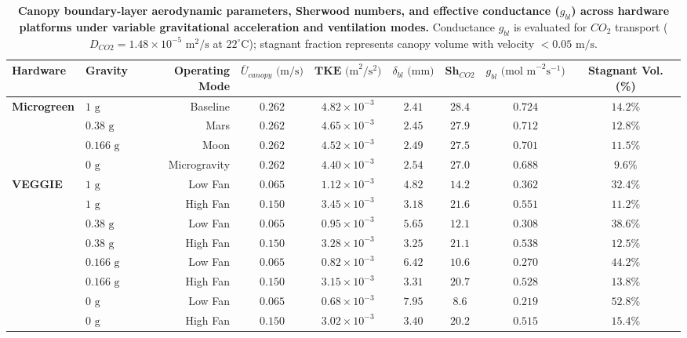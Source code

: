 \begin{table}[t]
\centering
\small
\caption{\textbf{Canopy boundary-layer aerodynamic parameters, Sherwood numbers, and effective conductance ($g_{bl}$) across hardware platforms under variable gravitational acceleration and ventilation modes.} Conductance $g_{bl}$ is evaluated for $CO_2$ transport ($D_{CO2} = 1.48 \times 10^{-5}\text{ m}^2/\text{s}$ at $22^\circ\text{C}$); stagnant fraction represents canopy volume with velocity $< 0.05\text{ m/s}$.}
\label{tab:aerodynamic_metrics}
\begin{tabularx}{\textwidth}{llrcccccc}
\toprule
\textbf{Hardware} & \textbf{Gravity} & \textbf{Operating Mode} & $\overline{U}_{canopy}\text{ (m/s)}$ & $\mathbf{TKE}\text{ (m}^2/\text{s}^2\text{)}$ & $\delta_{bl}\text{ (mm)}$ & $\mathbf{Sh}_{CO2}$ & $g_{bl}\text{ (mol m}^{-2}\text{s}^{-1}\text{)}$ & \textbf{Stagnant Vol. (\%)} \\
\midrule
\textbf{Microgreen} & $1\text{ g}$ & Baseline & $0.262$ & $4.82 \times 10^{-3}$ & $2.41$ & $28.4$ & $0.724$ & $14.2\%$ \\
& $0.38\text{ g}$ & Mars & $0.262$ & $4.65 \times 10^{-3}$ & $2.45$ & $27.9$ & $0.712$ & $12.8\%$ \\
& $0.166\text{ g}$ & Moon & $0.262$ & $4.52 \times 10^{-3}$ & $2.49$ & $27.5$ & $0.701$ & $11.5\%$ \\
& $0\text{ g}$ & Microgravity & $0.262$ & $4.40 \times 10^{-3}$ & $2.54$ & $27.0$ & $0.688$ & $9.6\%$ \\
\midrule
\textbf{VEGGIE} & $1\text{ g}$ & Low Fan & $0.065$ & $1.12 \times 10^{-3}$ & $4.82$ & $14.2$ & $0.362$ & $32.4\%$ \\
& $1\text{ g}$ & High Fan & $0.150$ & $3.45 \times 10^{-3}$ & $3.18$ & $21.6$ & $0.551$ & $11.2\%$ \\
& $0.38\text{ g}$ & Low Fan & $0.065$ & $0.95 \times 10^{-3}$ & $5.65$ & $12.1$ & $0.308$ & $38.6\%$ \\
& $0.38\text{ g}$ & High Fan & $0.150$ & $3.28 \times 10^{-3}$ & $3.25$ & $21.1$ & $0.538$ & $12.5\%$ \\
& $0.166\text{ g}$ & Low Fan & $0.065$ & $0.82 \times 10^{-3}$ & $6.42$ & $10.6$ & $0.270$ & $44.2\%$ \\
& $0.166\text{ g}$ & High Fan & $0.150$ & $3.15 \times 10^{-3}$ & $3.31$ & $20.7$ & $0.528$ & $13.8\%$ \\
& $0\text{ g}$ & Low Fan & $0.065$ & $0.68 \times 10^{-3}$ & $7.95$ & $8.6$ & $0.219$ & $52.8\%$ \\
& $0\text{ g}$ & High Fan & $0.150$ & $3.02 \times 10^{-3}$ & $3.40$ & $20.2$ & $0.515$ & $15.4\%$ \\

\end{tabularx}
\end{table}
